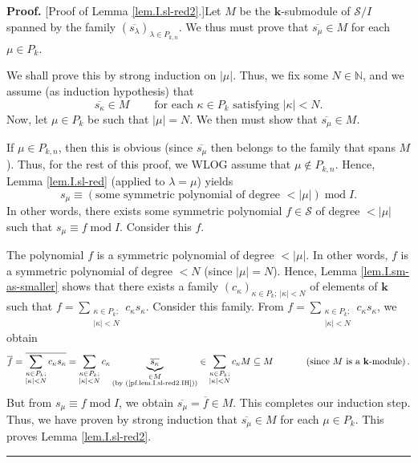 \documentclass[numbers=enddot,12pt,final,onecolumn,notitlepage]{scrartcl}%
\theoremstyle{definition}
\newenvironment{proof}[1][Proof]{\noindent\textbf{#1.} }{\ \rule{0.5em}{0.5em}}
\let\sumnonlimits\sum
\renewcommand{\sum}{\sumnonlimits\limits}
\begin{document}
\begin{proof}
[Proof of Lemma \ref{lem.I.sl-red2}.]Let $M$ be the $\mathbf{k}$-submodule of
$\mathcal{S}/I$ spanned by the family $\left(  \overline{s_{\lambda}}\right)
_{\lambda\in P_{k,n}}$. We thus must prove that $\overline{s_{\mu}}\in M$ for
each $\mu\in P_{k}$.

We shall prove this by strong induction on $\left\vert \mu\right\vert $. Thus,
we fix some $N\in\mathbb{N}$, and we assume (as induction hypothesis) that
\begin{equation}
\overline{s_{\kappa}}\in M\ \ \ \ \ \ \ \ \ \ \text{for each }\kappa\in
P_{k}\text{ satisfying }\left\vert \kappa\right\vert <N.
\label{pf.lem.I.sl-red2.IH}%
\end{equation}
Now, let $\mu\in P_{k}$ be such that $\left\vert \mu\right\vert =N$. We then
must show that $\overline{s_{\mu}}\in M$.

If $\mu\in P_{k,n}$, then this is obvious (since $\overline{s_{\mu}}$ then
belongs to the family that spans $M$). Thus, for the rest of this proof, we
WLOG assume that $\mu\notin P_{k,n}$. Hence, Lemma \ref{lem.I.sl-red} (applied
to $\lambda=\mu$) yields%
\[
s_{\mu}\equiv\left(  \text{some symmetric polynomial of degree }<\left\vert
\mu\right\vert \right)  \operatorname{mod}I.
\]
In other words, there exists some symmetric polynomial $f\in\mathcal{S}$ of
degree $<\left\vert \mu\right\vert $ such that $s_{\mu}\equiv
f\operatorname{mod}I$. Consider this $f$.

The polynomial $f$ is a symmetric polynomial of degree $<\left\vert
\mu\right\vert $. In other words, $f$ is a symmetric polynomial of degree $<N$
(since $\left\vert \mu\right\vert =N$). Hence, Lemma \ref{lem.I.sm-as-smaller}
shows that there exists a family $\left(  c_{\kappa}\right)  _{\kappa\in
P_{k};\ \left\vert \kappa\right\vert <N}$ of elements of $\mathbf{k}$ such
that $f=\sum_{\substack{\kappa\in P_{k};\\\left\vert \kappa\right\vert
<N}}c_{\kappa}s_{\kappa}$. Consider this family. From $f=\sum
_{\substack{\kappa\in P_{k};\\\left\vert \kappa\right\vert <N}}c_{\kappa
}s_{\kappa}$, we obtain%
\[
\overline{f}=\overline{\sum_{\substack{\kappa\in P_{k};\\\left\vert
\kappa\right\vert <N}}c_{\kappa}s_{\kappa}}=\sum_{\substack{\kappa\in
P_{k};\\\left\vert \kappa\right\vert <N}}c_{\kappa}\underbrace{\overline
{s_{\kappa}}}_{\substack{\in M\\\text{(by (\ref{pf.lem.I.sl-red2.IH}))}}%
}\in\sum_{\substack{\kappa\in P_{k};\\\left\vert \kappa\right\vert
<N}}c_{\kappa}M\subseteq M\ \ \ \ \ \ \ \ \ \ \left(  \text{since }M\text{ is
a }\mathbf{k}\text{-module}\right)  .
\]
But from $s_{\mu}\equiv f\operatorname{mod}I$, we obtain $\overline{s_{\mu}%
}=\overline{f}\in M$. This completes our induction step. Thus, we have proven
by strong induction that $\overline{s_{\mu}}\in M$ for each $\mu\in P_{k}$.
This proves Lemma \ref{lem.I.sl-red2}.
\end{proof}
\end{document}
